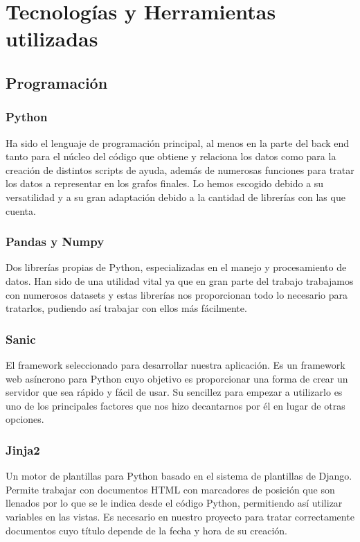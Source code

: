 \chapter{Tecnologías y Herramientas utilizadas}
\label{cap:tecnologias}

\section{Programación}

\subsection*{Python}

Ha sido el lenguaje de programación principal, al menos en la parte del back end tanto para el núcleo del código que obtiene y relaciona los datos como para la creación de distintos scripts de ayuda, además de numerosas funciones para tratar los datos a representar en los grafos finales. Lo hemos escogido debido a su versatilidad y a su gran adaptación debido a la cantidad de librerías con las que cuenta.

\subsection*{Pandas y Numpy}

Dos librerías propias de Python, especializadas en el manejo y procesamiento de datos. Han sido de una utilidad vital ya que en gran parte del trabajo trabajamos con numerosos datasets y estas librerías nos proporcionan todo lo necesario para tratarlos, pudiendo así trabajar con ellos más fácilmente.

\subsection*{Sanic}

El framework seleccionado para desarrollar nuestra aplicación. Es un framework web asíncrono para Python cuyo objetivo es proporcionar una forma de crear un servidor que sea rápido y fácil de usar. Su sencillez para empezar a utilizarlo es uno de los principales factores que nos hizo decantarnos por él en lugar de otras opciones.

\subsection*{Jinja2}

Un motor de plantillas para Python basado en el sistema de plantillas de Django. Permite trabajar con documentos HTML con marcadores de posición que son llenados por lo que se le indica desde el código Python, permitiendo así utilizar variables en las vistas. Es necesario en nuestro proyecto para tratar correctamente documentos cuyo título depende de la fecha y hora de su creación.

